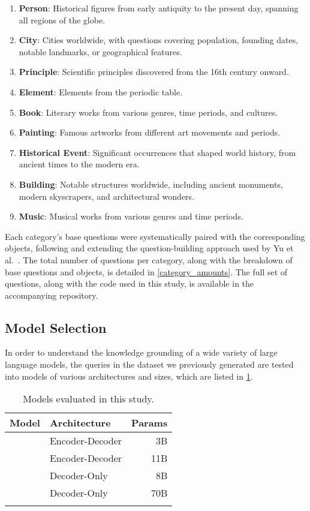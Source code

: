 \begin{enumerate}
	\item \textbf{Person}: Historical figures from early antiquity to the present day, spanning all regions of the globe.
	\item \textbf{City}: Cities worldwide, with questions covering population, founding dates, notable landmarks, or geographical features.
	\item \textbf{Principle}: Scientific principles discovered from the 16th century onward.
	\item \textbf{Element}: Elements from the periodic table.
	\item \textbf{Book}: Literary works from various genres, time periods, and cultures.
	\item \textbf{Painting}: Famous artworks from different art movements and periods.
	\item \textbf{Historical Event}: Significant occurrences that shaped world history, from ancient times to the modern era.
	\item \textbf{Building}: Notable structures worldwide, including ancient monuments, modern skyscrapers, and architectural wonders.
	\item \textbf{Music}: Musical works from various genres and time periods.
\end{enumerate}

Each category's base questions were systematically paired with the corresponding objects, following and extending the question-building approach used by Yu et al.~\cite{factual_recall}.
The total number of questions per category, along with the breakdown of base questions and objects, is detailed in \cref{category_amounts}.
The full set of questions, along with the code used in this study, is available in the accompanying repository.

\subsection{Model Selection}
\label{model_selection}

In order to understand the knowledge grounding of a wide variety of large language
models, the queries in the dataset we previously generated are tested into models of various architectures and sizes, which are listed in \cref{model_list}.

\begin{table}[t]
	\caption{Models evaluated in this study.}
	\label{model_list}
	\centering
	\footnotesize
	\begin{tabular}{l l r}
		\toprule
			Model             & Architecture    & Params \\
		\midrule
			\smallflan{}      & Encoder-Decoder & 3B          \\
			\bigflan{}        & Encoder-Decoder & 11B         \\
			\smallllama{}    & Decoder-Only    & 8B          \\
			\bigllama{} & Decoder-Only    & 70B         \\
		\bottomrule \addlinespace[4pt]
	\end{tabular}
\end{table}

